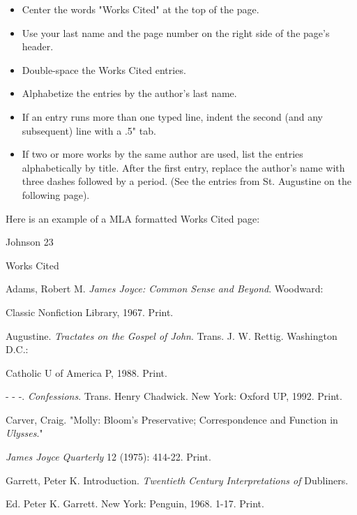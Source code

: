\begin{itemize}
\item Center the words "Works Cited" at the top of the page.
\item Use your last name and the page number on the right side of the page's header.
\item Double-space the Works Cited entries.
\item Alphabetize the entries by the author's last name.
\item If an entry runs more than one typed line, indent the second (and any 
subsequent) line with a .5" tab.
\item If two or more works by the same author are used, list the entries alphabetically 
by title. After the first entry, replace the author's name with three dashes followed by a 
period. (See the entries from St. Augustine on the following page).
\end{itemize}


Here is an example of a MLA formatted Works Cited page:

\newpage
\thispagestyle{empty}
\begin{flushright}Johnson 23\end{flushright}
\begin{center}
Works Cited
\end{center}
\begin{Spacing}{2}

Adams, Robert M. \emph{James Joyce: Common Sense and Beyond}. Woodward: 

\hspace{.5in}Classic Nonfiction Library, 1967. Print.

Augustine. \emph{Tractates on the Gospel of John}. Trans. J. W. Rettig. Washington D.C.:

\hspace{.4in}Catholic U of America P, 1988. Print.

- - -. \emph{Confessions}. Trans. Henry Chadwick. New York: Oxford UP, 1992. Print.

Carver, Craig. "Molly: Bloom's Preservative; Correspondence and Function in \emph{Ulysses}."

\hspace{.4in}\emph{James Joyce Quarterly} 12 (1975): 414-22. Print.

Garrett, Peter K. Introduction. \emph{Twentieth Century Interpretations of} Dubliners.

\hspace{.4in}Ed. Peter K. Garrett. New York: Penguin, 1968. 1-17. Print.

\end{Spacing}

